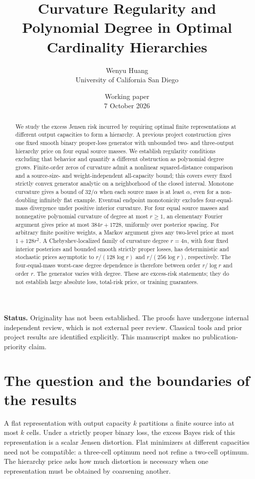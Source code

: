 \documentclass[11pt]{article}
\title{Curvature Regularity and Polynomial Degree in Optimal Cardinality Hierarchies}
\author{Wenyu Huang\\\small University of California San Diego}
\date{Working paper\\7 October 2026}
\theoremstyle{definition}\newtheorem{definition}[theorem]{Definition}
\theoremstyle{remark}\newtheorem{remark}[theorem]{Remark}
\begin{document}
\maketitle
\begin{center}\begin{minipage}{0.93\textwidth}\small
\textbf{Status.} Originality has not been established. The proofs have undergone internal independent review, which is not external peer review. Classical tools and prior project results are identified explicitly. This manuscript makes no publication-priority claim.
\end{minipage}\end{center}
\begin{abstract}
We study the excess Jensen risk incurred by requiring optimal finite representations at different output capacities to form a hierarchy. A previous project construction gives one fixed smooth binary proper-loss generator with unbounded two- and three-output hierarchy price on four equal source masses. We establish regularity conditions excluding that behavior and quantify a different obstruction as polynomial degree grows. Finite-order zeros of curvature admit a nonlinear squared-distance comparison and a source-size- and weight-independent all-capacity bound; this covers every fixed strictly convex generator analytic on a neighborhood of the closed interval. Monotone curvature gives a bound of $32/\alpha$ when each source mass is at least $\alpha$, even for a non-doubling infinitely flat example. Eventual endpoint monotonicity excludes four-equal-mass divergence under positive interior curvature. For four equal source masses and nonnegative polynomial curvature of degree at most $r\ge1$, an elementary Fourier argument gives price at most $384r+1728$, uniformly over posterior spacing. For arbitrary finite positive weights, a Markov argument gives any two-level price at most $1+128r^2$. A Chebyshev-localized family of curvature degree $r=4n$, with four fixed interior posteriors and bounded smooth strictly proper losses, has deterministic and stochastic prices asymptotic to $r/(128\log r)$ and $r/(256\log r)$, respectively. The four-equal-mass worst-case degree dependence is therefore between order $r/\log r$ and order $r$. The generator varies with degree. These are excess-risk statements; they do not establish large absolute loss, total-risk price, or training guarantees.
\end{abstract}

\section{The question and the boundaries of the results}
A flat representation with output capacity $k$ partitions a finite source into at most $k$ cells. Under a strictly proper binary loss, the excess Bayes risk of this representation is a scalar Jensen distortion. Flat minimizers at different capacities need not be compatible: a three-cell optimum need not refine a two-cell optimum. The hierarchy price asks how much distortion is necessary when one representation must be obtained by coarsening another.
\end{document}
